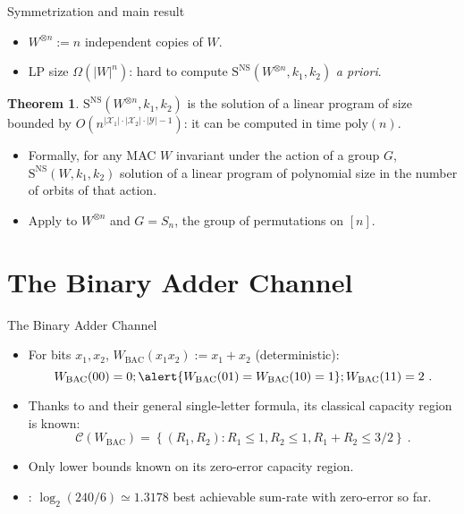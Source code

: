 \documentclass{beamer}
\theoremstyle{definition}
\newtheorem{theo}{Theorem}[section]
\theoremstyle{remark}
\begin{document}
\begin{frame}{Symmetrization and main result}
  \begin{itemize}
  \item $W^{\otimes n} := n$ independent copies of $W$.
  \item LP size $\Omega(|W|^n)$: hard to compute $\mathrm{S}^{\mathrm{NS}}(W^{\otimes n},k_1,k_2)$ \emph{a priori}.
  \end{itemize}
    \pause

    \begin{theo}
        $\mathrm{S}^{\mathrm{NS}}(W^{\otimes n},k_1,k_2)$ is the solution of a linear program of size bounded by $O\left(n^{|\mathcal{X}_1|\cdot|\mathcal{X}_2 |\cdot|\mathcal{Y}|-1}\right)$: it can be computed in time $\text{poly}(n)$.
    \end{theo}
    
    \pause
    \bigskip
    
    \begin{itemize}
    \item Formally, for any MAC $W$ invariant under the action of a group $G$, $\mathrm{S}^{\mathrm{NS}}(W,k_1,k_2)$ solution of a linear program of polynomial size in the number of orbits of that action.
    \item Apply to $W^{\otimes n}$ and $G=S_n$, the group of permutations on $[n]$.
    \end{itemize}
\end{frame}

\section{The Binary Adder Channel}
\begin{frame}{The Binary Adder Channel}
  \begin{itemize}
  \item For bits $x_1,x_2$, $W_{\text{BAC}}(x_1x_2) := x_1 + x_2$ (deterministic):
    \[ W_{\text{BAC}}(00) = 0; \alert{W_{\text{BAC}}(01) = W_{\text{BAC}}(10)=1}; W_{\text{BAC}}(11) = 2 \ . \]
    
    \pause
  \item Thanks to \cite{Liao73,Ahlswede73} and their general single-letter formula, its classical capacity region is known:
    \[ \mathcal{C}(W_{\text{BAC}}) = \left\{(R_1, R_2) : R_1 \leq 1, R_2 \leq 1, R_1 + R_2 \leq 3/2\right\} \ .\]

    \pause

  \item Only lower bounds known on its zero-error capacity region.
  \item \cite{MO05}: $\log_2(240/6) \simeq 1.3178$ best achievable sum-rate with zero-error so far.
  \end{itemize}
\end{frame}
\end{document}
